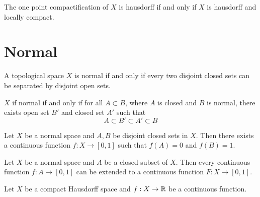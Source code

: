 \documentclass[twocolumn]{article}
\begin{document}
\begin{thm}
	The one point compactification of $X$ is hausdorff if and only if $X$ is hausdorff and locally compact.
\end{thm}

\section{Normal}

\begin{defi}[Normal]
	A topological space $X$ is normal if and only if every two disjoint closed sets can be separated by disjoint open sets.
\end{defi}

\begin{thm}
	$X$ if normal if and only if for all $A \subset B$, where $A$ is closed and $B$ is normal, there exists open set $B'$ and closed set $A'$ such that 
	$$
		A \subset B' \subset A' \subset B
	$$
\end{thm}

\begin{thm}
	Let $X$ be a normal space and $A, B$ be disjoint closed sets in $X$. 
	Then there exists a continuous function $f: X \rightarrow [0, 1]$ such that $f(A) = 0$ and $f(B) = 1$.	
\end{thm}

\begin{thm}
	Let $X$ be a normal space and $A$ be a closed subset of $X$. 
	Then every continuous function $f: A \rightarrow [0, 1]$ can be extended to a continuous function $F: X \rightarrow [0, 1]$.
\end{thm}

\begin{thm}
	Let $X$ be a compact Hausdorff space and $f: X \rightarrow \mathbb{R}$ be a continuous function. 
\end{thm}
\end{document}
